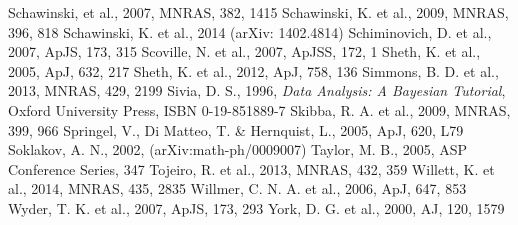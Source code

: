 \documentclass{mn2e}
\begin{document}
\begin{thebibliography}{}
 Schawinski, et al., 2007, MNRAS, 382, 1415
 Schawinski, K. et al., 2009, MNRAS, 396, 818
 Schawinski, K. et al., 2014 (arXiv: 1402.4814)
 Schiminovich, D. et al., 2007, ApJS, 173, 315
 Scoville, N. et al., 2007, ApJSS, 172, 1
 Sheth, K. et al., 2005, ApJ, 632, 217
 Sheth, K. et al., 2012, ApJ, 758, 136
 Simmons, B. D. et al., 2013, MNRAS, 429, 2199
 Sivia, D. S., 1996, \emph{Data Analysis: A Bayesian Tutorial}, Oxford University Press, ISBN 0-19-851889-7
 Skibba, R. A. et al., 2009, MNRAS, 399, 966
 Springel, V., Di Matteo, T. \& Hernquist, L., 2005, ApJ, 620, L79
 Soklakov, A. N., 2002, (arXiv:math-ph/0009007)
 Taylor, M. B., 2005, ASP Conference Series, 347
 Tojeiro, R. et al., 2013, MNRAS, 432, 359
 Willett, K. et al., 2014, MNRAS, 435, 2835
 Willmer, C. N. A. et al., 2006, ApJ, 647, 853
 Wyder, T. K. et al., 2007, ApJS, 173, 293
 York, D. G. et al., 2000, AJ, 120, 1579
\end{thebibliography}{}
\end{document}
